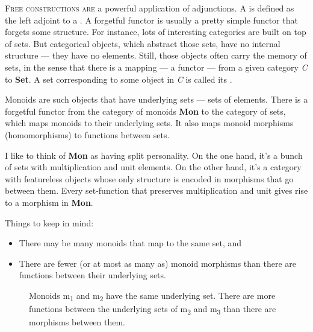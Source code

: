 \lettrine[lhang=0.17]{F}{ree constructions are} a powerful application of adjunctions. A
 is defined as the left adjoint to a . A forgetful functor is usually a pretty simple functor that
forgets some structure. For instance, lots of interesting categories are
built on top of sets. But categorical objects, which abstract those
sets, have no internal structure --- they have no elements. Still, those
objects often carry the memory of sets, in the sense that there is a
mapping --- a functor --- from a given category \emph{C} to
\textbf{Set}. A set corresponding to some object in \emph{C} is called
its .

Monoids are such objects that have underlying sets --- sets of elements.
There is a forgetful functor  from the category of monoids
\textbf{Mon} to the category of sets, which maps monoids to their
underlying sets. It also maps monoid morphisms (homomorphisms) to
functions between sets.

I like to think of \textbf{Mon} as having split personality. On the one
hand, it's a bunch of sets with multiplication and unit elements. On the
other hand, it's a category with featureless objects whose only
structure is encoded in morphisms that go between them. Every
set-function that preserves multiplication and unit gives rise to a
morphism in \textbf{Mon}.

Things to keep in mind:

\begin{itemize}
\tightlist
\item
  There may be many monoids that map to the same set, and
\item
  There are fewer (or at most as many as) monoid morphisms than there
  are functions between their underlying sets.
\end{itemize}

\begin{figure}[H]
\centering
{}
\caption{Monoids m\textsubscript{1} and m\textsubscript{2} have the same
underlying set. There are more functions between the underlying sets of
m\textsubscript{2} and m\textsubscript{3} than there are morphisms
between them.}
\end{figure}

